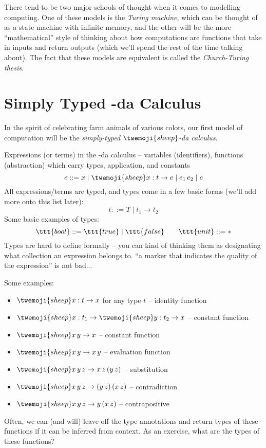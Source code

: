 \documentclass[12pt, nodate]{scrartcl}
\newcommand{\lamb}{\twemoji{sheep}}
\begin{document}
\begin{remark}
  There tend to be two major schools of thought when it comes to modelling
  computing. One of these models is the \emph{Turing machine}, which can be
  thought of as a state machine with infinite memory, and the other will be the
  more ``mathematical'' style of thinking about how computations are functions
  that take in inputs and return outputs (which we'll spend the rest of the time
  talking about). 
  The fact that these models are equivalent is called the \emph{Church-Turing thesis}. 
\end{remark}

\section{Simply Typed \texorpdfstring{\lamb-da}{Lamb-da} Calculus}
In the spirit of celebrating farm animals of various colors, 
our first model of computation will be the \emph{simply-typed $\lamb$-da calculus}. 

Expressions (or terms) in the \lamb-da calculus -- variables (identifiers),
functions (abstraction) which carry types, application, and constants
\[
  e ::= x \mid \lamb x:t \to e \mid e_1 \, e_2 \mid c  
\]
All expressions/terms are typed, and types come in a few basic forms (we'll add more onto this list later):  
\[
 t ::= T \mid t_1 \to t_2 
\]
Some basic examples of types: 
\[
  \ttt{bool} ::= \ttt{true} \mid \ttt{false} \qquad \ttt{unit} ::= *
\]
Types are hard to define formally -- you can kind of thinking them as
designating what collection an expression belongs to. 
``a marker that indicates the quality of the expression'' is not bad... 

Some examples: 
\begin{itemize}
  \item $\lamb x:t \to x$ for any type $t$ -- identity function 
  \item $\lamb x:t_1 \to \lamb y:t_2 \to x$ -- constant function
  \item $\lamb x \, y \to x$ -- constant function
  \item $\lamb x \, y \to x \, y$ -- evaluation function
  \item $\lamb x \, y \, z \to x \, z \, (y \, z)$ -- substitution
  \item $\lamb x \, y \, z \to (y \, z) \, (x \, z)$ -- contradiction 
  \item $\lamb x \, y \, z \to y \, (x \, z)$ -- contrapositive
\end{itemize}
Often, we can (and will) leave off the type annotations and return types of
these functions if it can be inferred from context. As an exercise, 
what are the types of these functions? 
\end{document}
